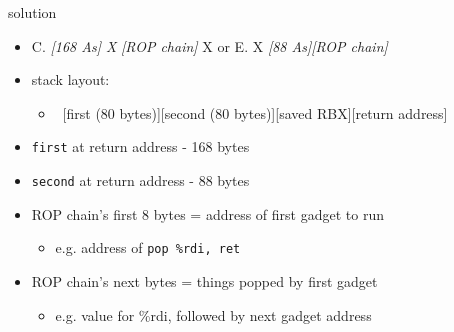 \begin{frame}{solution}
    \begin{itemize}
    \item {\scriptsize C. \textit{[168 As] X }\textit{[ROP chain]} X or E. X \textit{[88 As]}\textit{[ROP chain]}}
    \item stack layout: 
        \begin{itemize}
        \item ~[first (80 bytes)][second (80 bytes)][saved RBX][return address]
        \end{itemize}
    \item \texttt{first} at return address - 168 bytes
    \item \texttt{second} at return address - 88 bytes
    \item ROP chain's first 8 bytes = address of first gadget to run
        \begin{itemize}
        \item e.g. address of \texttt{pop \%rdi, ret}
        \end{itemize}
    \item ROP chain's next bytes = things popped by first gadget
        \begin{itemize}
        \item e.g. value for \%rdi, followed by next gadget address
        \end{itemize}
    \end{itemize}
\end{frame}
